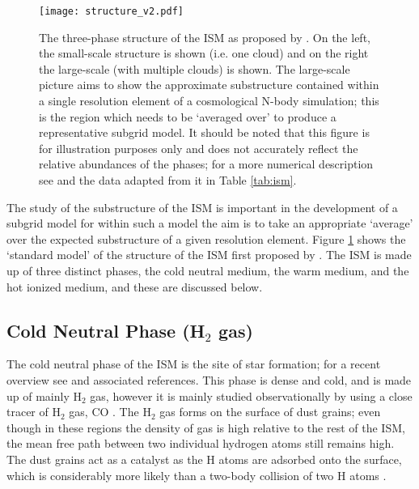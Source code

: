 \begin{figure}[ht]
    \centering

    \texttt{[image: structure\_v2.pdf]}

    \caption{The three-phase structure of the ISM as proposed by \citet{mckee_theory_1977}.
        On the left, the small-scale structure is shown (i.e. one cloud) and on the right the large-scale (with multiple clouds) is shown.
        The large-scale picture aims to show the approximate substructure contained within a single resolution element of a cosmological N-body simulation; this is the region which needs to be `averaged over' to produce a representative subgrid model.
    It should be noted that this figure is for illustration purposes only and does not accurately reflect the relative abundances of the phases; for a more numerical description see \citet{ferriere_interstellar_2001} and the data adapted from it in Table \ref{tab:ism}.}
    \label{fig:struct}
\end{figure}

The study of the substructure of the ISM is important in the development of a subgrid model for within such a model the aim is to take an appropriate `average' over the expected substructure of a given resolution element.
Figure \ref{fig:struct} shows the `standard model' of the structure of the ISM first proposed by \citet{mckee_theory_1977}.
The ISM is made up of three distinct phases, the cold neutral medium, the warm medium, and the hot ionized medium, and these are discussed below.

\subsection{Cold Neutral Phase (H$_2$ gas)}

The cold neutral phase of the ISM is the site of star formation; for a recent overview see \citet{mckee_theory_2007} and associated references.
This phase is dense and cold, and is made up of mainly H$_2$ gas, however it is mainly studied observationally by using a close tracer of H$_2$ gas, CO \citep{ferriere_interstellar_2001}.
The H$_2$ gas forms on the surface of dust grains; even though in these regions the density of gas is high relative to the rest of the ISM, the mean free path between two individual hydrogen atoms still remains high.
The dust grains act as a catalyst as the H atoms are adsorbed onto the surface, which is considerably more likely than a two-body collision of two H atoms \citep{gould_interstellar_1963}.

